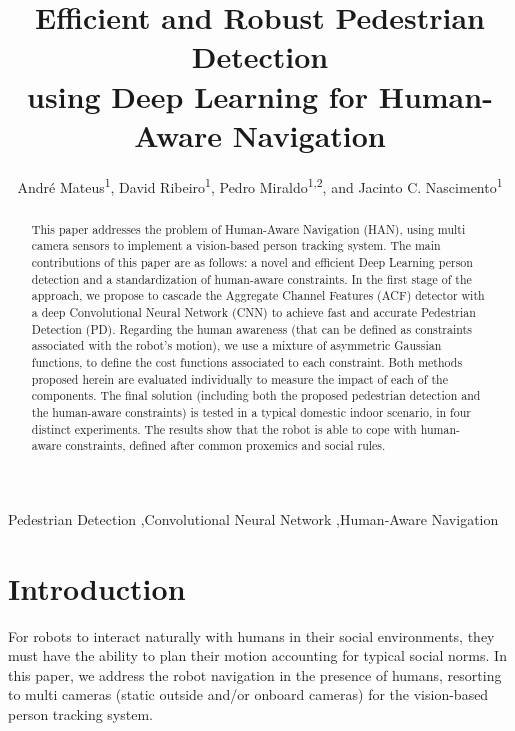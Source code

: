 \documentclass[5p,time]{elsarticle}
\begin{document}
\sloppy

\begin{frontmatter}

\title{Efficient and Robust Pedestrian Detection \\ using Deep Learning for Human-Aware Navigation
}

\author{Andr\'{e} Mateus\textsuperscript{1}, David Ribeiro\textsuperscript{1}, Pedro Miraldo\textsuperscript{1,2}, and Jacinto C. Nascimento\textsuperscript{1}}
\address{\textsuperscript{1}Instituto de Sistemas e Rob\'{o}tica (LARSyS), Instituto Superior T\'{e}cnico, Lisboa, Portugal.\\
\textsuperscript{2}Department of Automatic Control, KTH Royal Institute of Technology, Stockholm, Sweden.\\ Corresponding Author: {\tt andre.mateus@tecnico.ulisboa.pt}}

\begin{abstract}
This paper addresses the problem of Human-Aware Navigation (HAN), using multi camera sensors to implement a vision-based person tracking system. The main contributions of this paper are as follows: a novel and efficient Deep Learning person detection and a standardization of human-aware constraints. In the first stage of the approach, we propose to cascade the Aggregate Channel Features (ACF) detector with a deep Convolutional Neural Network (CNN) to achieve fast and accurate Pedestrian Detection (PD). Regarding the human awareness (that can be defined as constraints associated with the robot's motion), we use a mixture of asymmetric Gaussian functions, to define the cost functions associated to each constraint. Both methods proposed herein are evaluated individually to measure the impact of each of the components. The final solution (including both the proposed pedestrian detection and the human-aware constraints) is tested in a typical domestic indoor scenario, in four distinct experiments. The results show that the robot is able to cope with human-aware constraints, defined after common proxemics and social rules.
\end{abstract}

\begin{keyword}
Pedestrian Detection \sep Convolutional Neural Network \sep Human-Aware Navigation
\end{keyword}

\end{frontmatter}

\section{Introduction}
For robots to interact naturally with humans in their social
environments, they must have the ability to plan their motion
accounting for typical social norms. In this paper, we address
the robot navigation in the presence of humans, resorting to multi cameras (static outside and/or onboard
cameras) for the vision-based person tracking system.
\end{document}
